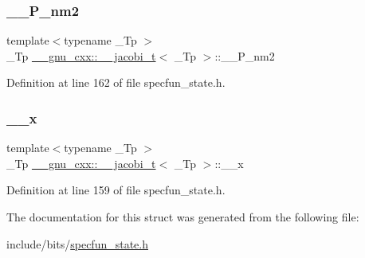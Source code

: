 \subsubsection{\texorpdfstring{\+\_\+\+\_\+\+P\+\_\+nm2}{\_\_P\_nm2}}
{\footnotesize\ttfamily template$<$typename \+\_\+\+Tp $>$ \\
\+\_\+\+Tp \hyperlink{struct____gnu__cxx_1_1____jacobi__t}{\+\_\+\+\_\+gnu\+\_\+cxx\+::\+\_\+\+\_\+jacobi\+\_\+t}$<$ \+\_\+\+Tp $>$\+::\+\_\+\+\_\+\+P\+\_\+nm2}



Definition at line 162 of file specfun\+\_\+state.\+h.

\mbox{\label{struct____gnu__cxx_1_1____jacobi__t_aa3213c7241c094633f0be6f210b04e17}} 
\subsubsection{\texorpdfstring{\+\_\+\+\_\+x}{\_\_x}}
{\footnotesize\ttfamily template$<$typename \+\_\+\+Tp $>$ \\
\+\_\+\+Tp \hyperlink{struct____gnu__cxx_1_1____jacobi__t}{\+\_\+\+\_\+gnu\+\_\+cxx\+::\+\_\+\+\_\+jacobi\+\_\+t}$<$ \+\_\+\+Tp $>$\+::\+\_\+\+\_\+x}



Definition at line 159 of file specfun\+\_\+state.\+h.



The documentation for this struct was generated from the following file\+:\begin{DoxyCompactItemize}
\item 
include/bits/\hyperlink{specfun__state_8h}{specfun\+\_\+state.\+h}\end{DoxyCompactItemize}
